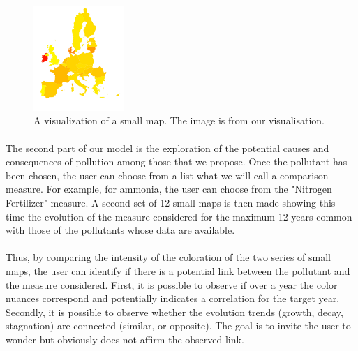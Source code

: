 \documentclass[preprint,journal]{vgtc}       %
\begin{document}
\begin{figure}[H]
 \centering %
 \includegraphics[width=130px]{smallmap}
 \caption{A visualization of a small map. The image is from our visualisation.}
 \label{fig:smallmapammoniac}
\end{figure}

\paragraph{}
The second part of our model is the exploration of the potential causes and consequences of pollution among those that we propose. Once the pollutant has been chosen, the user can choose from a list what we will call a comparison measure. For example, for ammonia, the user can choose from the "Nitrogen Fertilizer" measure. A second set of 12 small maps is then made showing this time the evolution of the measure considered for the maximum 12 years common with those of the pollutants whose data are available.

\paragraph{}
Thus, by comparing the intensity of the coloration of the two series of small maps, the user can identify if there is a potential link between the pollutant and the measure considered. First, it is possible to observe if over a year the color nuances correspond and potentially indicates a correlation for the target year. Secondly, it is possible to observe whether the evolution trends (growth, decay, stagnation) are connected (similar, or opposite). The goal is to invite the user to wonder but obviously does not affirm the observed link.

\newpage
\end{document}
